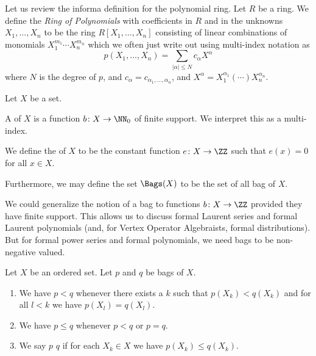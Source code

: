 \begin{remark}
Let us review the informa definition for the polynomial ring.
Let $R$ be a ring. We define the \emph{Ring of Polynomials} with
coefficients in $R$ and in the unknowns $X_{1},\dots,X_{n}$ to be the
ring $R[X_{1},\dots,X_{n}]$ consisting of linear combinations of
monomials $X_{1}^{m_{1}}\cdots X_{n}^{m_{n}}$ which we often just
write out using multi-index notation as
\begin{equation}
p(X_{1},\dots,X_{n}) = \sum_{|\alpha|\leq N} c_{\alpha}X^{\alpha}
\end{equation}
where $N$ is the degree of $p$,
and $c_{\alpha}=c_{\alpha_{1},\dots,\alpha_{n}}$,
and $X^{\alpha} = X_{1}^{\alpha_{1}}(\cdots)X_{n}^{\alpha_{n}}$. 
\end{remark}

\begin{definition}[Bags]
Let $X$ be a set.

A  of $X$ is a function $b\colon X\to\NN_{0}$
of finite support. We interpret this as a multi-index.

We define the  of $X$ to be the constant function
$e\colon X\to\ZZ$ such that $e(x)=0$ for all $x\in X$.

Furthermore, we may define the set $\Bags(X)$ to be the set of all bag
of $X$.
\end{definition}

\begin{remark}
We could generalize the notion of a bag to functions $b\colon X\to\ZZ$
provided they have finite support. This allows us to discuss formal
Laurent series and formal Laurent polynomials (and, for Vertex
Operator Algebraists, formal distributions). But for formal power
series and formal polynomials, we need bags to be non-negative valued.
\end{remark}

\begin{definition}
Let $X$ be an ordered set.
Let $p$ and $q$ be bags of $X$.
\begin{enumerate}
\item We have $p < q$ whenever there exists a $k$ such that
$p(X_{k})<q(X_{k})$ and for all $l<k$ we have $p(X_{l})=q(X_{l})$.
\item We have $p\leq q$ whenever $p<q$ or $p=q$.
\item We say $p$  $q$ if for each $X_{k}\in X$ we have
  $p(X_{k})\leq q(X_{k})$.
\end{enumerate}
\end{definition}

